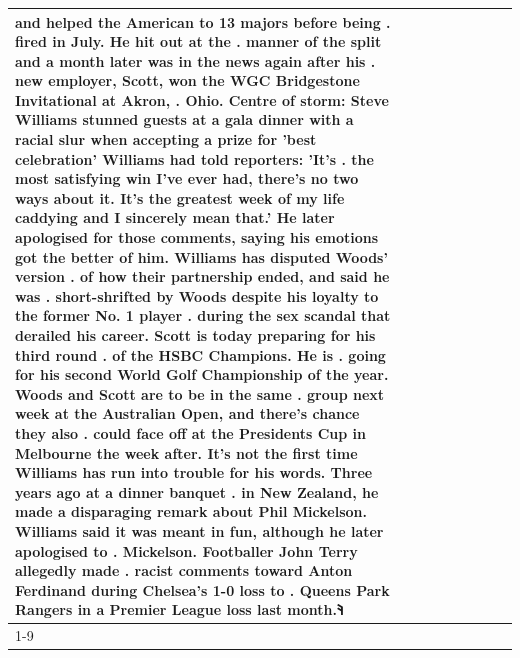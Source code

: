 \begin{table}[H]
\begin{tabular}{lllrlllll}
and helped the American to 13 majors before being . fired in July. He hit out at the . manner of the split and a month later was in the news again after his . new employer, Scott, won the WGC Bridgestone Invitational at Akron, . Ohio. Centre of storm: Steve Williams stunned guests at a gala dinner with a racial slur when accepting a prize for 'best celebration' Williams had told reporters: 'It's . the most satisfying win I've ever had, there's no two ways about it. It's the greatest week of my life caddying and I sincerely mean that.' He later apologised for those comments, saying his emotions got the better of him. Williams has disputed Woods' version . of how their partnership ended, and said he was . short-shrifted by Woods despite his loyalty to the former No. 1 player . during the sex scandal that derailed his career. Scott is today preparing for his third round . of the HSBC Champions. He is . going for his second World Golf Championship of the year. Woods and Scott are to be in the same . group next week at the Australian Open, and there's chance they also . could face off at the Presidents Cup in Melbourne the week after. It's not the first time Williams has run into trouble for his words. Three years ago at a dinner banquet . in New Zealand, he made a disparaging remark about Phil Mickelson. Williams said it was meant in fun, although he later apologised to . Mickelson. Footballer John Terry allegedly made . racist comments toward Anton Ferdinand during Chelsea's 1-0 loss to . Queens Park Rangers in a Premier League loss last month.𐰚 \\
\cline{1-9}

\end{tabular}
\end{table}
